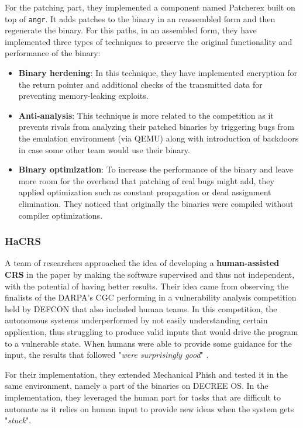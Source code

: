 \documentclass[12pt,a4paper,english,onecolumn]{IEEEtran}
\begin{document}
For the patching part, they implemented a component named Patcherex built on top of \texttt{angr}. It adds patches to the binary in an reassembled form \cite{ramblr} and then regenerate the binary. For this paths, in an assembled form, they have implemented three types of techniques to preserve the original functionality and performance of the binary:
\begin{itemize}
    \item \textbf{Binary herdening}: In this technique, they have implemented encryption for the return pointer and additional checks of the transmitted data for preventing memory-leaking exploits.
    \item \textbf{Anti-analysis}: This technique is more related to the competition as it prevents rivals from analyzing their patched binaries by triggering bugs from the emulation environment (via QEMU) along with introduction of backdoors in case some other team would use their binary.
    \item \textbf{Binary optimization}: To increase the performance of the binary and leave more room for the overhead that patching of real bugs might add, they applied optimization such as constant propagation or dead assignment elimination. They noticed that originally the binaries were compiled without compiler optimizations.
\end{itemize}

\subsubsection{HaCRS}

A team of researchers approached the idea of developing a \textbf{human-assisted CRS} in the paper \cite{hacrs} by making the software supervised and thus not independent, with the potential of having better results. Their idea came from observing the finalists of the DARPA's CGC performing in a vulnerability analysis competition held by DEFCON that also included human teams. In this competition, the autonomous systems underperformed by not easily understanding certain application, thus struggling to produce valid inputs that would drive the program to a vulnerable state. When humans were able to provide some guidance for the input, the results that followed "\textit{were surprisingly good}" \cite{hacrs}.

For their implementation, they extended Mechanical Phish and tested it in the same environment, namely a part of the binaries on DECREE OS. In the implementation, they leveraged the human part for tasks that are difficult to automate as it relies on human input to provide new ideas when the system gets "\textit{stuck}".
\end{document}
